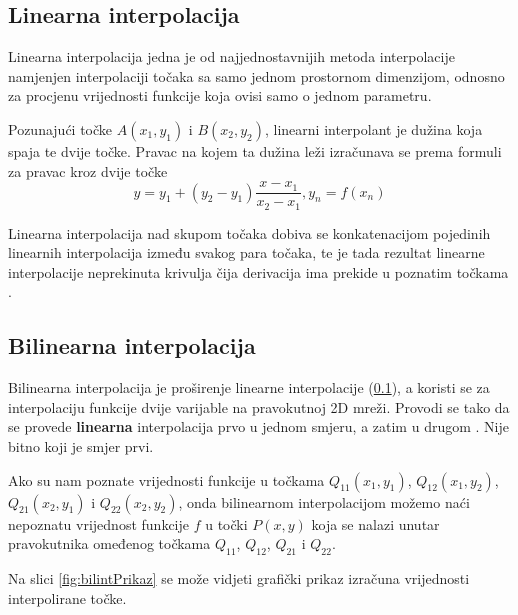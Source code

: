 
\subsection{Linearna interpolacija}
\label{interpolation:lin}

Linearna interpolacija jedna je od najjednostavnijih metoda interpolacije namjenjen interpolaciji točaka sa samo jednom prostornom dimenzijom, odnosno za procjenu vrijednosti funkcije koja ovisi samo o jednom parametru. 

Pozunajući točke $A (x_1, y_1)$ i $B (x_2, y_2)$, linearni interpolant je dužina koja spaja te dvije točke. Pravac na kojem ta dužina leži izračunava se prema formuli za pravac kroz dvije točke \citep{_linear_2013}
\begin{equation}
	y = y_1 + (y_2 - y_1) \frac{x - x_1}{x_2 - x_1}, y_n = f(x_n)
\end{equation}

Linearna interpolacija nad skupom točaka dobiva se konkatenacijom pojedinih linearnih interpolacija između svakog para točaka, te je tada rezultat linearne interpolacije neprekinuta krivulja čija derivacija ima prekide u poznatim točkama \citep{Bosilj2010} \citep{_linear_2013}.

\subsection{Bilinearna interpolacija}

Bilinearna interpolacija je proširenje linearne interpolacije (\ref{interpolation:lin}), a koristi se za interpolaciju funkcije dvije varijable na pravokutnoj 2D mreži. Provodi se tako da se provede \textbf{linearna} interpolacija prvo u jednom smjeru, a zatim u drugom \citep {_bilinear_2013}. Nije bitno koji je smjer prvi.

Ako su nam poznate vrijednosti funkcije u točkama $Q_{11} (x_1, y_1)$, $Q_{12} (x_1, y_2)$, $Q_{21}  (x_2, y_1)$ i $Q_{22} (x_2, y_2)$, onda bilinearnom interpolacijom možemo naći nepoznatu vrijednost funkcije $f$ u točki $P (x, y)$ koja se nalazi unutar pravokutnika omeđenog točkama $Q_{11}$, $Q_{12}$, $Q_{21}$ i $Q_{22}$.

Na slici \eqref{fig:bilintPrikaz} se može vidjeti grafički prikaz izračuna vrijednosti interpolirane točke.

